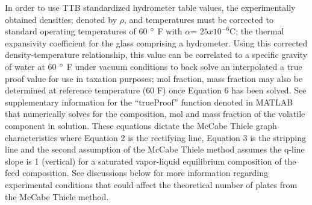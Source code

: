 \documentclass[peerreview, a4paper, 12pt]{IEEEtran}
\begin{document}
In order to use TTB standardized hydrometer table values, the experimentally obtained densities; denoted by $\rho$, and temperatures must be corrected to standard operating temperatures of 60 $\degree$ F with $\alpha$= \( 25x10^{-6}\)\degree C; the thermal expansivity coefficient for the glass comprising a hydrometer. Using this corrected density-temperature relationship, this value can be correlated to a specific gravity of water at 60 $\degree$ F under vacuum conditions to back solve an interpolated a true proof value for use in taxation purposes; mol fraction, mass fraction may also be determined at reference temperature (60 F) once Equation 6 has been solved. See supplementary information for the “trueProof” function denoted in MATLAB that numerically solves for the composition, mol and mass fraction of the volatile component in solution. These equations dictate the McCabe Thiele graph characteristics where Equation 2 is the rectifying line, Equation 3 is the stripping line and the second assumption of the McCabe Thiele method assumes the q-line slope is 1 (vertical) for a saturated vapor-liquid equilibrium composition of the feed composition. See discussions below for more information regarding experimental conditions that could affect the theoretical number of plates from the McCabe Thiele method.
\end{document}
